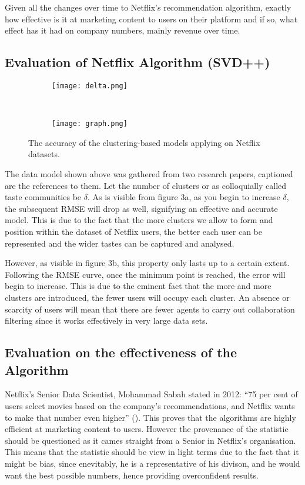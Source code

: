 \documentclass[12pt,a4paper]{article}
\begin{document}
Given all the changes over time to Netflix's recommendation algorithm, exactly how effective is it at marketing content to users on their platform and if so, what effect has it had on company numbers, mainly revenue over time.

\subsection{Evaluation of Netflix Algorithm (SVD++)}

\begin{figure}[H]
	\centering
	\begin{subfigure}[b]{0.45\textwidth}
		\texttt{[image: delta.png]}
		\caption{\cite{mirbakhsh2013clustering}}
	\end{subfigure}
	~
	\begin{subfigure}[b]{0.45\textwidth}
		\texttt{[image: graph.png]}
		\caption{\cite{daruru2009pervasive}}
	\end{subfigure}
	\caption{The accuracy of the clustering-based models applying on Netflix datasets.}
\end{figure}

The data model shown above was gathered from two research papers, captioned are the references to them. Let the number of clusters or as colloquially called taste communities be \(\delta\). As is visible from figure 3a, as you begin to increase \(\delta\), the subsequent RMSE will drop as well, signifying an effective and accurate model. This is due to the fact that the more clusters we allow to form and position within the dataset of Netflix users, the better each user can be represented and the wider tastes can be captured and analysed.

However, as visible in figure 3b, this property only lasts up to a certain extent. Following the RMSE curve, once the minimum point is reached, the error will begin to increase. This is due to the eminent fact that the more and more clusters are introduced, the fewer users will occupy each cluster. An absence or scarcity of users will mean that there are fewer agents to carry out collaboration filtering since it works effectively in very large data sets.

\subsection{Evaluation on the effectiveness of the Algorithm}

Netflix’s Senior Data Scientist, Mohammad Sabah stated in 2012: \enquote{75 per cent of users select movies based on the company’s recommendations, and Netflix wants to make that number even higher} (\cite{harris_2012}). This proves that the algorithms are highly efficient at marketing content to users. However the provenance of the statistic should be questioned as it cames straight from a Senior in Netflix's organisation. This means that the statistic should be view in light terms due to the fact that it might be bias, since enevitably, he is a representative of his divison, and he would want the best possible numbers, hence providing overconfident results.
\end{document}

